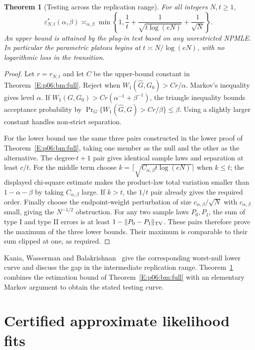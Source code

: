 \documentclass[11pt,a4paper]{article}
\newtheorem{theorem}{Theorem}[section]
\theoremstyle{definition}
\theoremstyle{remark}
\numberwithin{equation}{section}
\begin{document}
\begin{theorem}[Testing across the replication range]
\label{E:bt:testing}
For all integers $N,t\ge1$,
\[
 \varepsilon^*_{N,t}(\alpha,\beta)
 \asymp_{\alpha,\beta}
 \min\left\{1,\frac1t+\frac1{\sqrt{t\log(eN)}}+\frac1{\sqrt N}\right\}.
\]
An upper bound is attained by the plug-in test based on any unrestricted
NPMLE. In particular the parametric plateau begins at
$t\asymp N/\log(eN)$, with no logarithmic loss in the transition.
\end{theorem}
\begin{proof}
Let $r=r_{N,t}$ and let $C$ be the upper-bound constant in
Theorem~\ref{E:p06:bm:full}. Reject when
$W_1(\widehat G,G_0)>Cr/\alpha$. Markov's inequality gives level
$\alpha$. If $W_1(G,G_0)>Cr(\alpha^{-1}+\beta^{-1})$, the triangle
inequality bounds acceptance probability by
$\Pr_G\{W_1(\widehat G,G)>Cr/\beta\}\le\beta$.
Using a slightly larger constant handles non-strict separation.

For the lower bound use the same three pairs constructed in the lower
proof of Theorem~\ref{E:p06:bm:full}, taking one member as the null and
the other as the alternative. The degree-$t+1$ pair gives identical
sample laws and separation at least $c/t$. For the middle term choose
$k=\lceil\sqrt{C_{\alpha,\beta}t\log(eN)}\rceil$ when $k\le t$;
the displayed chi-square estimate makes the product-law total variation
smaller than $1-\alpha-\beta$ by taking $C_{\alpha,\beta}$ large.
If $k>t$, the $1/t$ pair already gives the required order. Finally
choose the endpoint-weight perturbation of size
$c_{\alpha,\beta}/\sqrt N$ with $c_{\alpha,\beta}$ small, giving
the $N^{-1/2}$ obstruction. For any two sample laws $P_0,P_1$,
the sum of type I and type II errors is at least
$1-\|P_0-P_1\|_{\rm TV}$. These pairs therefore prove the maximum
of the three lower bounds. Their maximum is comparable to their sum
clipped at one, as required.
\end{proof}

Kania, Wasserman and Balakrishnan~\cite[Section 3, Theorem 3]{BT_KWB2025}
give the corresponding worst-null lower curve and discuss the gap in
the intermediate replication range. Theorem~\ref{E:bt:testing}
combines the estimation bound of Theorem~\ref{E:p06:bm:full}
with an elementary Markov argument to obtain the stated testing curve.



\clearpage

\section{Certified approximate likelihood fits}
\label{E:upst:sec}
\end{document}
